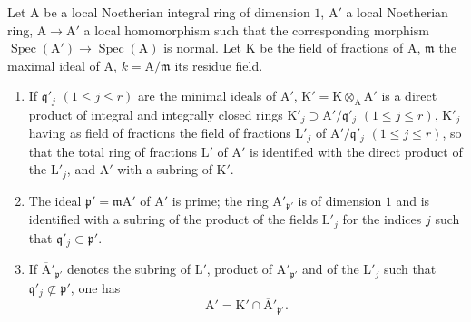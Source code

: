 \begin{lemma}[6.14.1.2]
\label{IV.6.14.1.2}
\label{IV.6.14.1.2.env}
Let $\mathrm{A}$ be a local Noetherian integral ring of dimension $1$, $\mathrm{A}'$ a local
Noetherian ring, $\mathrm{A}\to\mathrm{A}'$ a local homomorphism such that the corresponding morphism
$\operatorname{Spec}(\mathrm{A}')\to\operatorname{Spec}(\mathrm{A})$ is normal. Let $\mathrm{K}$ be the field of fractions of $\mathrm{A}$, $\mathfrak{m}$ the maximal ideal of $\mathrm{A}$,
$k=\mathrm{A}/\mathfrak{m}$ its residue field.
\begin{enumerate}[label=\textup{(\roman*)}]
  \item If $\mathfrak{q}'_j$ $(1\leqslant j\leqslant r)$ are the minimal ideals of $\mathrm{A}'$, $\mathrm{K}'=\mathrm{K}\otimes_\mathrm{A}\mathrm{A}'$ is a direct product
of integral and integrally closed rings $\mathrm{K}'_j\supset\mathrm{A}'/\mathfrak{q}'_j$ $(1\leqslant j\leqslant r)$, $\mathrm{K}'_j$ having as field of fractions
the field of fractions $\mathrm{L}'_j$ of $\mathrm{A}'/\mathfrak{q}'_j$ $(1\leqslant j\leqslant r)$, so that the total ring of fractions $\mathrm{L}'$ of $\mathrm{A}'$
is identified with the direct product of the $\mathrm{L}'_j$, and $\mathrm{A}'$ with a subring of $\mathrm{K}'$.
  \item The ideal $\mathfrak{p}'=\mathfrak{m}\mathrm{A}'$ of $\mathrm{A}'$ is prime; the ring $\mathrm{A}'_{\mathfrak{p}'}$ is of dimension $1$ and is identified
with a subring of the product of the fields $\mathrm{L}'_j$ for the indices $j$ such that $\mathfrak{q}'_j\subset\mathfrak{p}'$.
  \item If $\overline{\mathrm{A}}'_{\mathfrak{p}'}$ denotes the subring of $\mathrm{L}'$, product of $\mathrm{A}'_{\mathfrak{p}'}$ and of the $\mathrm{L}'_j$ such that $\mathfrak{q}'_j\not\subset\mathfrak{p}'$, one has
\begin{equation}
\tag{6.14.1.3}
\label{IV.6.14.1.3}
  \mathrm{A}'=\mathrm{K}'\cap\overline{\mathrm{A}}'_{\mathfrak{p}'}.
\end{equation}
\end{enumerate}
\end{lemma}

